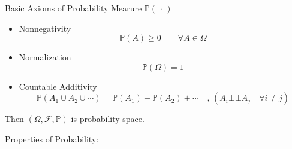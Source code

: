     
    
    
\begin{point}
    Basic Axioms of Probability Mearure $ \mathbb{P}(\,\cdot\,) $
\end{point}

\begin{itemize}[itemsep=2pt,topsep=-2pt]
\item Nonnegativity
\begin{equation}    \mathbb{P}(A)\geq 0\qquad \forall A\in\Omega    
\end{equation}
\item Normalization
\begin{equation}    \mathbb{P}(\Omega)=1    
\end{equation}
\item Countable Additivity
\begin{equation}    \mathbb{P}(A_1\cup A_2\cup\cdots)=\mathbb{P}(A_1)+\mathbb{P}(A_2)+\cdots\quad ,\, (A_i\bot\!\!\!\bot  A_j\quad \forall i\neq j)
\end{equation}
\end{itemize}

    Then $(\Omega,\mathscr{F},\mathbb{P})$ is probability space.

\begin{point}
        Properties of Probability:
\end{point}

